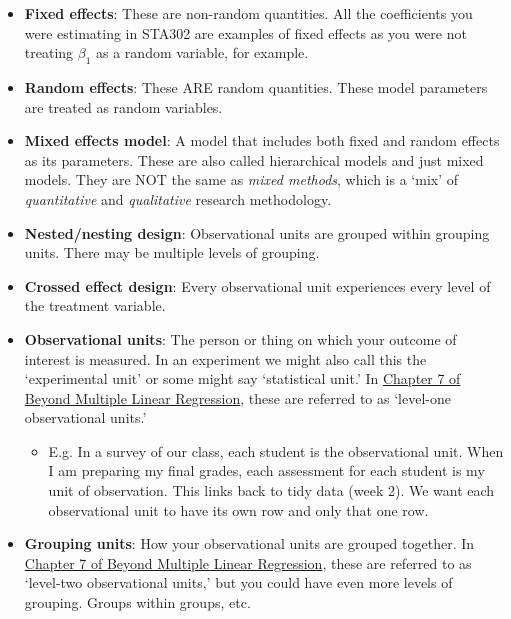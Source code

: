 \documentclass[
  openany]{book}
\providecommand{\tightlist}{%
  \setlength{\itemsep}{0pt}\setlength{\parskip}{0pt}}
\begin{document}
\begin{itemize}
\tightlist
\item
  \textbf{Fixed effects}: These are non-random quantities. All the coefficients you were estimating in STA302 are examples of fixed effects as you were not treating \(\beta_1\) as a random variable, for example.
\item
  \textbf{Random effects}: These ARE random quantities. These model parameters are treated as random variables.
\item
  \textbf{Mixed effects model}: A model that includes both fixed and random effects as its parameters. These are also called hierarchical models and just mixed models. They are NOT the same as \emph{mixed methods}, which is a `mix' of \emph{quantitative} and \emph{qualitative} research methodology.
\item
  \textbf{Nested/nesting design}: Observational units are grouped within grouping units. There may be multiple levels of grouping.
\item
  \textbf{Crossed effect design}: Every observational unit experiences every level of the treatment variable.
\item
  \textbf{Observational units}: The person or thing on which your outcome of interest is measured. In an experiment we might also call this the `experimental unit' or some might say `statistical unit.' In \href{https://bookdown.org/roback/bookdown-BeyondMLR/ch-corrdata.html\#recognizing-correlation}{Chapter 7 of Beyond Multiple Linear Regression}, these are referred to as `level-one observational units.'

  \begin{itemize}
  \tightlist
  \item
    E.g. In a survey of our class, each student is the observational unit. When I am preparing my final grades, each assessment for each student is my unit of observation. This links back to tidy data (week 2). We want each observational unit to have its own row and only that one row.
  \end{itemize}
\item
  \textbf{Grouping units}: How your observational units are grouped together. In \href{https://bookdown.org/roback/bookdown-BeyondMLR/ch-corrdata.html\#recognizing-correlation}{Chapter 7 of Beyond Multiple Linear Regression}, these are referred to as `level-two observational units,' but you could have even more levels of grouping. Groups within groups, etc.
\end{itemize}
\end{document}
